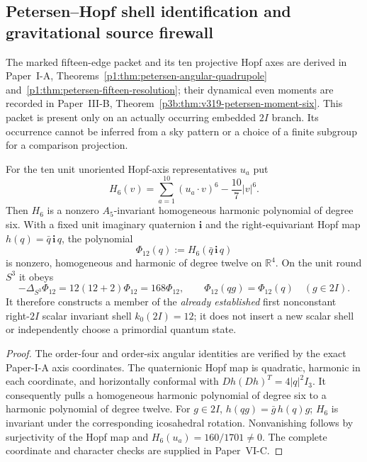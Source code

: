 \documentclass[12pt,a4paper]{article}
\begin{document}
\subsection{Petersen--Hopf shell identification and gravitational source firewall}
\label{p6a:sec:v322-petersen-shell}
The marked fifteen-edge packet and its ten projective Hopf axes are derived
in Paper~I-A, Theorems~\ref{p1:thm:petersen-angular-quadrupole}
and~\ref{p1:thm:petersen-fifteen-resolution}; their dynamical even moments
are recorded in Paper~III-B, Theorem~\ref{p3b:thm:v319-petersen-moment-six}.
This packet is present only on an actually occurring embedded $2I$ branch.
Its occurrence cannot be inferred from a sky pattern or a choice of a
finite subgroup for a comparison projection.

\begin{proposition}
\label{p6a:prop:v322-petersen-k12}
For the ten unit unoriented Hopf-axis representatives $u_a$ put
\[
 H_6(v)=\sum_{a=1}^{10}(u_a\cdot v)^6-\frac{10}{7}|v|^6.
\]
Then $H_6$ is a nonzero $A_5$-invariant homogeneous harmonic polynomial of
degree six.  With a fixed unit imaginary quaternion $\mathbf i$ and the
right-equivariant Hopf map $h(q)=\bar q\,\mathbf i\,q$, the polynomial
\[
 \boxed{\Phi_{12}(q):=H_6(\bar q\,\mathbf i\,q)}
\]
is nonzero, homogeneous and harmonic of degree twelve on $\mathbb R^4$.
On the unit round $S^3$ it obeys
\[
 -\Delta_{S^3}\Phi_{12}=12(12+2)\Phi_{12}=168\Phi_{12},
 \qquad \Phi_{12}(qg)=\Phi_{12}(q)\quad(g\in2I).
\]
It therefore constructs a member of the \emph{already established}
first nonconstant right-$2I$ scalar invariant shell $k_0(2I)=12$;
it does not insert a new scalar shell or independently choose a primordial
quantum state.
\end{proposition}
\begin{proof}
The order-four and order-six angular identities are verified by the exact
Paper-I-A axis coordinates.  The quaternionic Hopf map is quadratic,
harmonic in each coordinate, and horizontally conformal with
$Dh(Dh)^T=4|q|^2I_3$.  It consequently pulls a homogeneous harmonic
polynomial of degree six to a harmonic polynomial of degree twelve.
For $g\in2I$, $h(qg)=\bar g\,h(q)g$; $H_6$ is invariant under the
corresponding icosahedral rotation.  Nonvanishing follows by surjectivity
of the Hopf map and $H_6(u_a)=160/1701\ne0$.
The complete coordinate and character checks are supplied in Paper~VI-C.
\end{proof}
\end{document}
